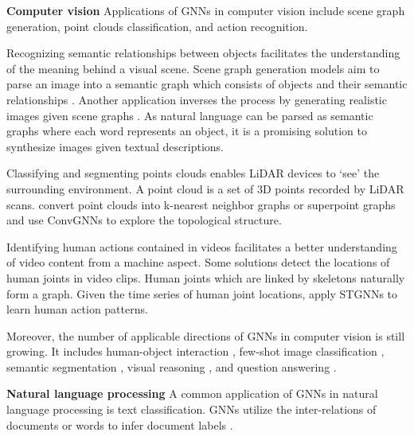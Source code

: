    \vspace{2mm}\noindent\textbf{Computer vision}
    Applications of GNNs in computer vision include scene graph generation, point clouds classification, and action recognition.
    
    Recognizing semantic relationships between objects facilitates the understanding of the meaning behind a visual scene. Scene graph generation models aim to parse an image into a semantic graph which consists of objects and their semantic relationships \cite{xu2017scene,yang2018graph,li2018factorizable}.   Another application inverses the process by generating realistic images given scene graphs \cite{johnson2018image}. As natural language can be parsed as semantic graphs where each word represents an object, it is a promising solution to synthesize images given textual descriptions. 
    
    Classifying and segmenting points clouds enables LiDAR devices to `see' the surrounding environment. A point cloud is a set of 3D points recorded by LiDAR scans.  \cite{wang2018dynamic,landrieu2017large, te2018rgcnn} convert point clouds into k-nearest neighbor graphs or superpoint graphs and use ConvGNNs to explore the topological structure.
    
    Identifying human actions contained in videos facilitates a better understanding of video content from a machine aspect. Some solutions detect the locations of human joints in video clips. Human joints which are linked by skeletons naturally form a graph. Given the time series of human joint locations, \cite{jain2016structural,yan2018spatial} apply STGNNs to learn human action patterns.
    
    Moreover, the number of applicable directions of GNNs in computer vision is still growing. It includes human-object interaction \cite{qi2018learning}, few-shot image classification \cite{garcia2018fewshot, guo2018neural,liu2019prototype}, semantic segmentation \cite{qi20173d,yi2017syncspeccnn}, visual reasoning \cite{chen2018iterative}, and question answering \cite{narasimhan2018out}.
    
    

    \vspace{2mm}\noindent\textbf{Natural language processing} 
    A common application of GNNs in natural language processing is text classification. GNNs utilize the inter-relations of documents or words to infer document labels \cite{kipf2017semi, hamilton2017inductive, velickovic2017graph}. 
   
